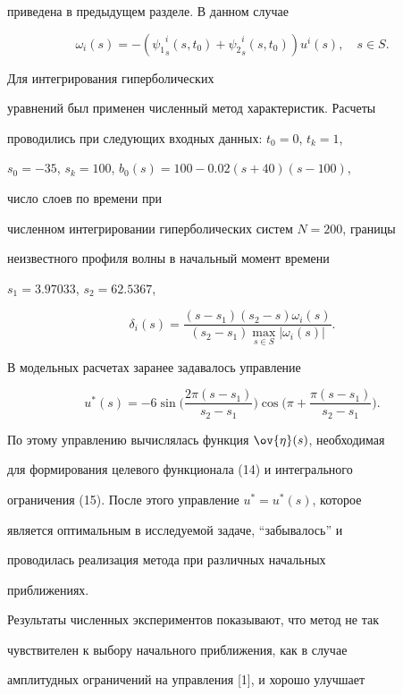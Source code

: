 приведена в предыдущем разделе. В данном случае


$$


\omega_i (s) = - ( {\psi_1}^i_s (s,t_0) + {\psi_2}^i_s (s,t_0) )


 u^i(s), \quad s \in S.


$$


Для интегрирования гиперболических


уравнений был применен численный метод характеристик. Расчеты


проводились при следующих входных данных: $t_0=0$, $t_k =1$,


$s_0=-35$, $s_k=100$, $b_0(s)=100-0.02(s+40)(s-100)$,


число слоев по времени при


численном интегрировании гиперболических систем $N=200$, границы


неизвестного профиля волны в начальный момент времени


$s_1=3.97033$, $s_2=62.5367$,


$$


\delta_i (s) = \frac{ (s-s_1) (s_2-s) \omega_i (s)}{(s_2-s_1)


\max \limits_{s \in S} |\omega_i (s)|}.


$$


В модельных расчетах заранее задавалось управление


$$


u^* (s) = - 6 \sin \bigg( \frac{2 \pi (s-s_1)}{s_2-s_1} \bigg)


 \cos \bigg(\pi + \frac{\pi (s-s_1)}{s_2-s_1}\bigg).


$$


По этому управлению вычислялась функция $\ov{\eta} (s)$, необходимая


для формирования целевого функционала (14) и интегрального


ограничения (15). После этого управление $u^*=u^* (s)$, которое


является оптимальным в исследуемой задаче, ``забывалось'' и


проводилась реализация метода при различных начальных


приближениях.





Результаты численных экспериментов показывают, что метод не так


чувствителен к выбору начального приближения, как в случае


амплитудных ограничений на управления [1], и хорошо улучшает


